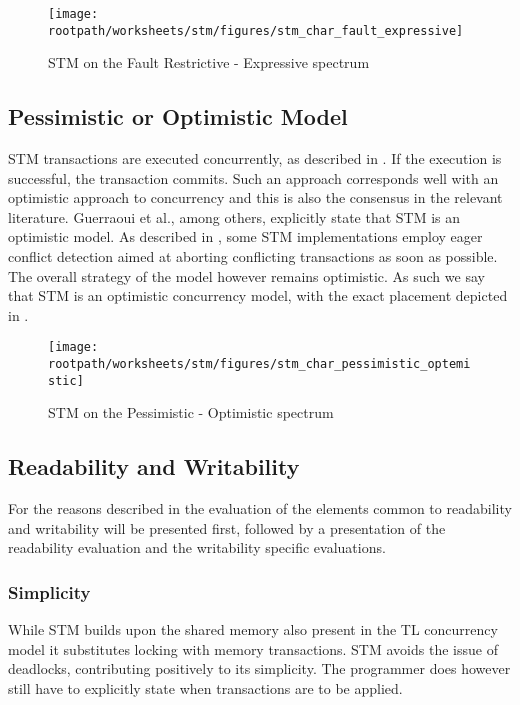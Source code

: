 \begin{figure}[htbp]
\centering
 \texttt{[image: \\rootpath/worksheets/stm/figures/stm\_char\_fault\_expressive]} 
 \caption{\ac{STM} on the Fault Restrictive - Expressive spectrum}
\label{fig:stm_char_fault_expressive}
\end{figure}

\subsection{Pessimistic or Optimistic Model}
\ac{STM} transactions are executed concurrently, as described in . If the execution is successful, the transaction commits. Such an approach corresponds well with an optimistic approach to concurrency and this is also the consensus in the relevant literature. Guerraoui et al., among others, explicitly state that \ac{STM} is an optimistic model\cite[p. 1]{guerraoui2005toward}. As described in , some \ac{STM} implementations employ eager conflict detection aimed at aborting conflicting transactions as soon as possible. The overall strategy of the model however remains optimistic. As such we say that \ac{STM} is an optimistic concurrency model, with the exact placement depicted in .

\begin{figure}[htbp]
\centering
 \texttt{[image: \\rootpath/worksheets/stm/figures/stm\_char\_pessimistic\_optemistic]} 
 \caption{\ac{STM} on the Pessimistic - Optimistic spectrum}
\label{fig:stm_char_pes_opti}
\end{figure}

\subsection{Readability and Writability}
For the reasons described in  the evaluation of the elements common to readability and writability will be presented first, followed by a presentation of the readability evaluation and the writability specific evaluations.

\subsubsection{Simplicity}
\label{subsec:stm_char_simplicity}
While \ac{STM} builds upon the shared memory also present in the \ac{TL} concurrency model it substitutes locking with memory transactions. \ac{STM} avoids the issue of deadlocks, contributing positively to its simplicity. The programmer does however still have to explicitly state when transactions are to be applied.

